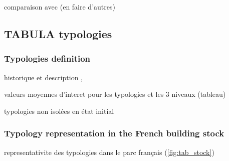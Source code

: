 \documentclass[11pt]{article}
\begin{document}
        comparaison avec \textcite{pomianowski_method_2023} (en faire d'autres)


    \subsection{TABULA typologies} %
    \label{sub:tabula_typologies}
    
        \subsubsection{Typologies definition} %
        \label{ssub:typologies_definition}
        
        historique et description
        \cite{pouget_consultants_batiments_2015}, \cite{loga_tabula_2016}

        valeurs moyennes d'interet pour les typologies et les 3 niveaux (tableau)

        typologies non isolées en état initial 

        \subsubsection{Typology representation in the French building stock} %
        \label{ssub:typologies_distribution}
        
        representativite des typologies dans le parc français (\ref{fig:tab_stock})
\end{document}
